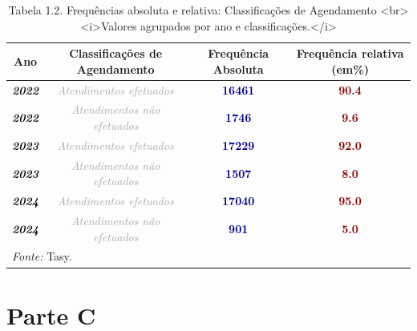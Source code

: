 \documentclass[
  letterpaper,
  DIV=11,
  numbers=noendperiod]{scrreprt}
\begin{document}
\begin{table}
\centering
\caption{Tabela 1.2. Frequências absoluta e relativa: Classificações de Agendamento  <br><i>Valores agrupados por ano e classificações.</i>}
\centering
\begin{tabular}[t]{>{}c|>{}c|>{}c|>{}c}
\hline
Ano & Classificações de Agendamento & Frequência Absoluta & Frequência relativa (em\%)\\
\hline
\textcolor{black}{\em{\textbf{2022}}} & \textcolor{darkgray}{\em{Atendimentos efetuados}} & \textcolor{darkblue}{\textbf{16461}} & \textcolor{darkred}{\textbf{90.4}}\\
\hline
\textcolor{black}{\em{\textbf{2022}}} & \textcolor{darkgray}{\em{Atendimentos não efetuados}} & \textcolor{darkblue}{\textbf{1746}} & \textcolor{darkred}{\textbf{9.6}}\\
\hline
\textcolor{black}{\em{\textbf{2023}}} & \textcolor{darkgray}{\em{Atendimentos efetuados}} & \textcolor{darkblue}{\textbf{17229}} & \textcolor{darkred}{\textbf{92.0}}\\
\hline
\textcolor{black}{\em{\textbf{2023}}} & \textcolor{darkgray}{\em{Atendimentos não efetuados}} & \textcolor{darkblue}{\textbf{1507}} & \textcolor{darkred}{\textbf{8.0}}\\
\hline
\textcolor{black}{\em{\textbf{2024}}} & \textcolor{darkgray}{\em{Atendimentos efetuados}} & \textcolor{darkblue}{\textbf{17040}} & \textcolor{darkred}{\textbf{95.0}}\\
\hline
\textcolor{black}{\em{\textbf{2024}}} & \textcolor{darkgray}{\em{Atendimentos não efetuados}} & \textcolor{darkblue}{\textbf{901}} & \textcolor{darkred}{\textbf{5.0}}\\
\hline
\multicolumn{4}{l}{\rule{0pt}{1em}\textit{Fonte: } Tasy.}\\
\end{tabular}
\end{table}

\section{Parte C}
\end{document}
